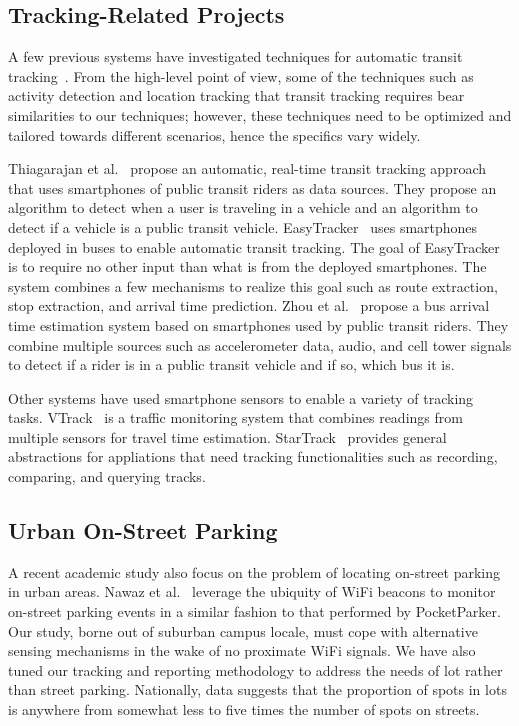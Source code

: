 \subsection{Tracking-Related Projects}

A few previous systems have investigated techniques for automatic transit
tracking~\cite{Biagioni:2011:EAT, Thiagarajan:2010:CTT, Zhou:2012:LWP}. From the
high-level point of view, some of the techniques such as activity detection and
location tracking that transit tracking requires bear similarities to
our techniques; however, these techniques need to be optimized and tailored
towards different scenarios, hence the specifics vary widely.

Thiagarajan et al.~\cite{Thiagarajan:2010:CTT} propose an automatic, real-time
transit tracking approach that uses smartphones of public transit riders as data
sources. They propose an algorithm to detect when a user is traveling in a
vehicle and an algorithm to detect if a vehicle is a public transit vehicle.
EasyTracker~\cite{Biagioni:2011:EAT} uses smartphones deployed in buses to
enable automatic transit tracking. The goal of EasyTracker is to require no
other input than what is from the deployed smartphones. The system combines a
few mechanisms to realize this goal such as route extraction, stop extraction,
and arrival time prediction. Zhou et al.~\cite{Zhou:2012:LWP} propose a bus
arrival time estimation system based on smartphones used by public transit
riders. They combine multiple sources such as accelerometer data, audio, and
cell tower signals to detect if a rider is in a public transit vehicle and if
so, which bus it is.

Other systems have used smartphone sensors to enable a variety of tracking
tasks. VTrack~\cite{Thiagarajan:2009:VAE} is a traffic monitoring system that
combines readings from multiple sensors for travel time estimation.
StarTrack~\cite{Ananthanarayanan:2009:SFE} provides general abstractions for
appliations that need tracking functionalities such as recording, comparing, and
querying tracks.

\subsection{Urban On-Street Parking}

A recent academic study also focus on the problem of locating on-street
parking in urban areas.  Nawaz et al.~\cite{Nawaz:2013:PSB} leverage the ubiquity of WiFi
beacons to monitor on-street parking events in a similar fashion to that
performed by PocketParker.  Our study, borne out of suburban campus locale,
must cope with alternative sensing mechanisms in the wake of no proximate WiFi
signals.  We have also tuned our tracking and reporting methodology to address
the needs of lot rather than street parking.  Nationally, data suggests that
the proportion of spots in lots is anywhere from somewhat less to five times
the number of spots on streets.~\cite{Environ}
